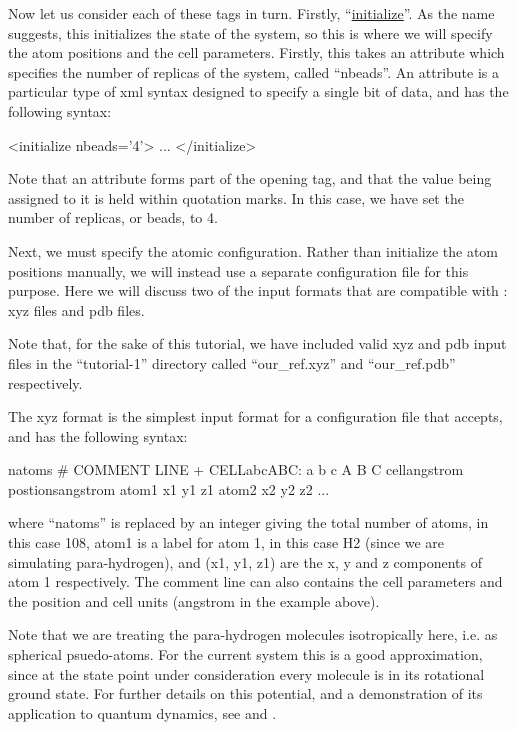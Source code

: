 \documentclass[11pt,english,fleqn]{report}
\newenvironment{code}{%
\footnotesize 
\verbatim
}{
\endverbatim
\normalsize
}
\begin{document}
Now let us consider each of these tags in turn. Firstly, 
{}``\hyperref[INITIALIZER]{initialize}''.
As the name suggests, this initializes the state of the system, so
this is where we will specify the atom positions and the cell
parameters. Firstly, this takes an attribute which specifies the number
of replicas of the system, called {}``nbeads''. An attribute is
a particular type of xml syntax designed to specify a single bit of
data, and has the following syntax:

\begin{code}
<initialize nbeads='4'>
   ...
</initialize>
\end{code}

Note that an attribute forms part of the opening tag, and that the
value being assigned to it is held within quotation marks. In this
case, we have set the number of replicas, or beads, to 4.

Next, we must specify the atomic configuration. Rather than initialize
the atom positions manually, we will instead use a separate configuration 
file for this purpose.
Here we will discuss two of the input formats that are compatible
with \ipi: xyz files and pdb files.

Note that, for the sake of this tutorial, we have 
included valid xyz and pdb input
files in the {}``tutorial-1'' directory called {}``our\_ref.xyz''
and {}``our\_ref.pdb'' respectively.

The xyz format is the simplest input format
for a configuration file that \ipi accepts, and has the following
syntax:

\begin{code}
natoms
# COMMENT LINE + CELL{abcABC}: a b c A B C cell{angstrom} postions{angstrom}
atom1   x1  y1  z1
atom2   x2  y2  z2
...
\end{code}
where {}``natoms'' is replaced by an integer giving the total number
of atoms, in this case 108, atom1 is a label for atom 1, in this case
H2 (since we are simulating para-hydrogen), and (x1, y1, z1) are the
x, y and z components of atom 1 respectively. The comment line can
also contains the cell parameters and the position and cell units
(angstrom in the example above).

Note that we are treating the para-hydrogen molecules isotropically here,
i.e. as spherical psuedo-atoms.
For the current system this is a good approximation, since at 
the state point under consideration every molecule is in its 
rotational ground state. For further details on this potential,
and a demonstration of its application to quantum dynamics, see
\cite{silv-gold78jcp} and \cite{mill-mano05jcp}.
\end{document}

